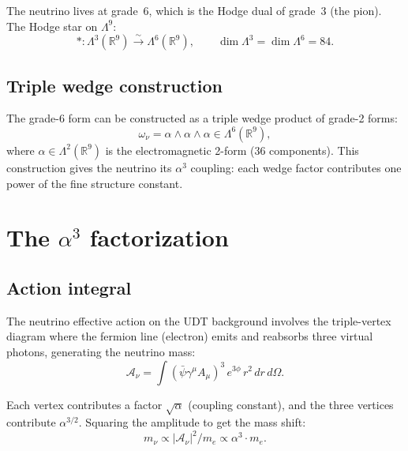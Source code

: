 \documentclass[11pt,letterpaper]{article}
\numberwithin{equation}{section}
\begin{document}
The neutrino lives at grade~6, which is the Hodge dual of grade~3
(the pion). The Hodge star on $\Lambda^9$:
\begin{equation}
\label{eq:hodge}
  *: \Lambda^3(\mathbb{R}^9) \xrightarrow{\sim} \Lambda^6(\mathbb{R}^9),
  \qquad \dim\Lambda^3 = \dim\Lambda^6 = 84.
\end{equation}

\subsection{Triple wedge construction}

The grade-6 form can be constructed as a triple wedge product of grade-2 forms:
\begin{equation}
\label{eq:triple_wedge}
  \omega_\nu = \alpha \wedge \alpha \wedge \alpha \in \Lambda^6(\mathbb{R}^9),
\end{equation}
where $\alpha \in \Lambda^2(\mathbb{R}^9)$ is the electromagnetic 2-form
(36 components). This construction gives the neutrino its $\alpha^3$
coupling: each wedge factor contributes one power of the fine structure
constant.

\section{The $\alpha^3$ factorization}
\label{sec:alpha3}

\subsection{Action integral}

The neutrino effective action on the UDT background involves the
triple-vertex diagram where the fermion line (electron) emits and
reabsorbs three virtual photons, generating the neutrino mass:
\begin{equation}
\label{eq:action}
  \mathcal{A}_\nu = \int\!\left(\bar{\psi}\gamma^\mu A_\mu\right)^3\,
  e^{3\phi}\,r^2\,dr\,d\Omega.
\end{equation}

Each vertex contributes a factor $\sqrt{\alpha}$ (coupling constant), and
the three vertices contribute $\alpha^{3/2}$. Squaring the amplitude to
get the mass shift:
\begin{equation}
  m_\nu \propto |\mathcal{A}_\nu|^2 / m_e \propto \alpha^3 \cdot m_e.
\end{equation}
\end{document}
